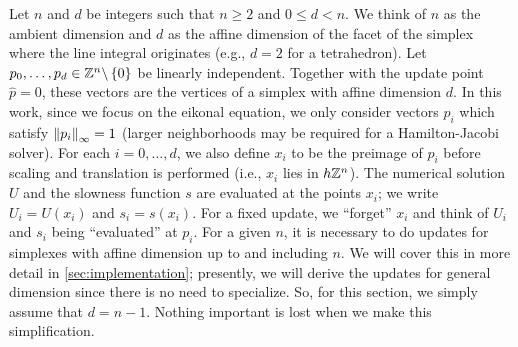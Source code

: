 \documentclass[sisc-eikonal.tex]{subfiles}
\begin{document}
Let $n$ and $d$ be integers such that $n \geq 2$ and $0 \leq d <
n$. We think of $n$ as the ambient dimension and $d$ as the affine
dimension of the facet of the simplex where the line integral
originates (e.g., $d = 2$ for a tetrahedron). Let
$p_0, \hdots, p_d \in \mathbb{Z}^n \backslash \left\{0\right\}$ be linearly
independent. Together with the update point $\hat{p} = 0$, these
vectors are the vertices of a simplex with affine dimension $d$. In
this work, since we focus on the eikonal equation, we only consider
vectors $p_i$ which satisfy $\left\|p_i\right\|_\infty = 1$ (larger
neighborhoods may be required for a Hamilton-Jacobi solver). For each
$i = 0, \hdots, d$, we also define $x_i$ to be the preimage of $p_i$
before scaling and translation is performed (i.e., $x_i$ lies in
$h \mathbb{Z}^n$). The numerical solution $U$ and the slowness function $s$
are evaluated at the points $x_i$; we write $U_i = U(x_i)$ and
$s_i = s(x_i)$. For a fixed update, we ``forget'' $x_i$ and think of
$U_i$ and $s_i$ being ``evaluated'' at $p_i$. For a given $n$, it is
necessary to do updates for simplexes with affine dimension up to and
including $n$. We will cover this in more detail in
\cref{sec:implementation}; presently, we will derive the updates for
general dimension since there is no need to specialize. So, for this
section, we simply assume that $d = n - 1$. Nothing important is lost
when we make this simplification.
\end{document}
